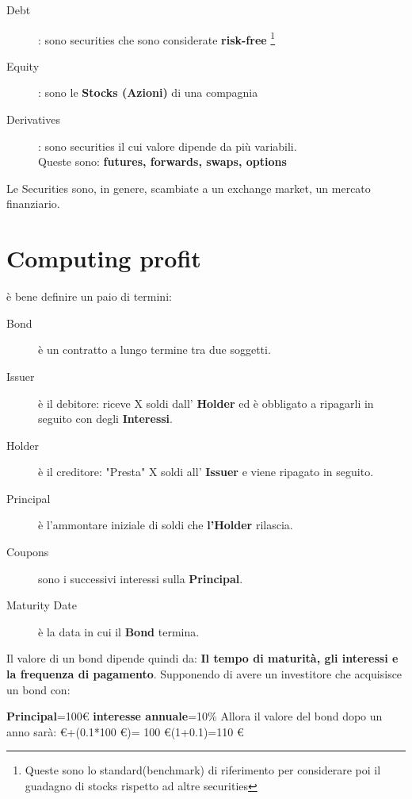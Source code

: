 \documentclass[a4paper,11pt]{report}
\begin{document}
{\begin{description}
\item[Debt]: sono securities che sono considerate \textbf{risk-free} \footnote{Queste sono lo standard(benchmark) di riferimento per considerare poi il guadagno di stocks rispetto ad altre securities}
\item[Equity]: sono le \textbf{Stocks (Azioni)} di una compagnia
\item[Derivatives]: sono securities il cui valore dipende da più variabili. \\ Queste sono: \bfseries {futures, forwards, swaps, options}
\end{description}
Le Securities sono, in genere, scambiate a un exchange market, un mercato finanziario. \newpage

\section{Computing profit}


è bene definire un paio di termini:
\begin {description}
\item[Bond] è un contratto a lungo termine tra due soggetti.
\item[Issuer] è il debitore: riceve X soldi dall' {\bfseries Holder} ed è obbligato a ripagarli in seguito con degli {\bfseries Interessi}.
\item[Holder] è il creditore: "Presta" X soldi all' {\bfseries Issuer} e viene ripagato in seguito.
\item[Principal] è l'ammontare iniziale di soldi che {\bfseries l'Holder} rilascia.
\item[Coupons] sono i successivi interessi sulla {\bfseries Principal}.
\item[Maturity Date] è la data in cui il {\bfseries Bond} termina.
\end {description}
Il valore di un bond dipende quindi da:  {\bfseries Il tempo di maturità, gli interessi e la frequenza di pagamento}. \newline
Supponendo di avere un investitore che acquisisce un bond con: 
\begin{center}
\textbf{Principal}=100\euro \newline
\textbf{interesse annuale}=10\% \newline
Allora il valore del bond dopo un anno sarà: \euro+(0.1*100 \euro)= 100 \euro *(1+0.1)=110 \euro
\end{center}
\newpage

}
\end{document}
